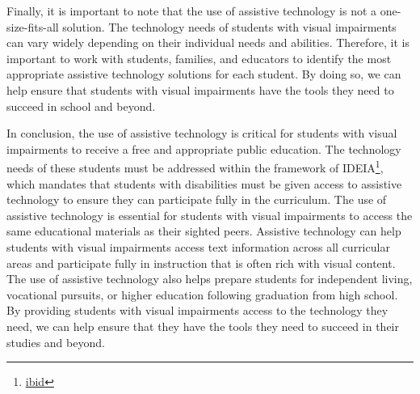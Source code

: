 Finally, it is important to note that the use of assistive technology is not a one-size-fits-all solution. The technology needs of students with visual impairments can vary widely depending on their individual needs and abilities. Therefore, it is important to work with students, families, and educators to identify the most appropriate assistive technology solutions for each student. By doing so, we can help ensure that students with visual impairments have the tools they need to succeed in school and beyond.

In conclusion, the use of assistive technology is critical for students with visual impairments to receive a free and appropriate public education. The technology needs of these students must be addressed within the framework of IDEIA\footnote{\raggedright \href{http://sites.ed.gov/idea/statuteregulations/}{ibid}}, which mandates that students with disabilities must be given access to assistive technology to ensure they can participate fully in the curriculum. The use of assistive technology is essential for students with visual impairments to access the same educational materials as their sighted peers. Assistive technology can help students with visual impairments access text information across all curricular areas and participate fully in instruction that is often rich with visual content. The use of assistive technology also helps prepare students for independent living, vocational pursuits, or higher education following graduation from high school. By providing students with visual impairments access to the technology they need, we can help ensure that they have the tools they need to succeed in their studies and beyond.
